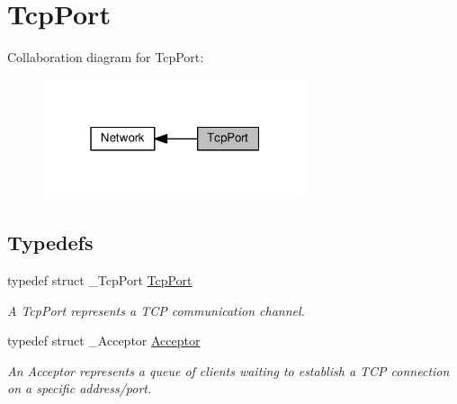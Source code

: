 \hypertarget{group__tcp}{}\section{Tcp\+Port}
\label{group__tcp}
Collaboration diagram for Tcp\+Port\+:\nopagebreak
\begin{figure}[H]
\begin{center}
\leavevmode
\includegraphics[width=220pt]{group__tcp}
\end{center}
\end{figure}
\subsection*{Typedefs}
\begin{DoxyCompactItemize}
\item 
\mbox{\label{group__tcp_gaffe71a51b1d23f2e4e54ccfb67bb30f8}} 
typedef struct \+\_\+\+Tcp\+Port \hyperlink{group__tcp_gaffe71a51b1d23f2e4e54ccfb67bb30f8}{Tcp\+Port}
\begin{DoxyCompactList}\small\item\em A Tcp\+Port represents a T\+CP communication channel. \end{DoxyCompactList}\item 
\mbox{\label{group__tcp_ga99fb3ed761c86c0379dc50f80c51c87a}} 
typedef struct \+\_\+\+Acceptor \hyperlink{group__tcp_ga99fb3ed761c86c0379dc50f80c51c87a}{Acceptor}
\begin{DoxyCompactList}\small\item\em An Acceptor represents a queue of clients waiting to establish a T\+CP connection on a specific address/port. \end{DoxyCompactList}\end{DoxyCompactItemize}
